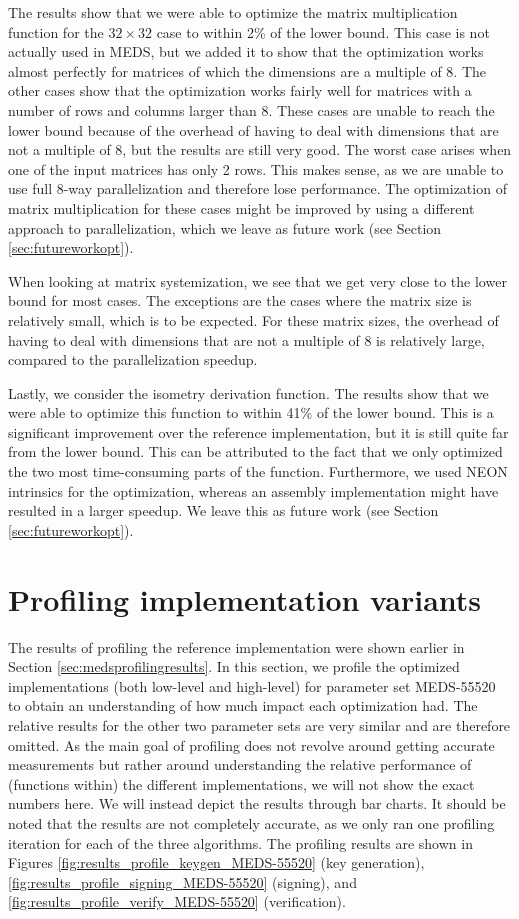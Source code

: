 \documentclass[11pt,a4paper]{report}
\theoremstyle{definition}
\begin{document}
The results show that we were able to optimize the matrix multiplication function for the $32 \times 32$ case to within 2\% of the lower bound. This case is not actually used in MEDS, but we added it to show that the optimization works almost perfectly for matrices of which the dimensions are a multiple of 8. The other cases show that the optimization works fairly well for matrices with a number of rows and columns larger than 8. These cases are unable to reach the lower bound because of the overhead of having to deal with dimensions that are not a multiple of 8, but the results are still very good. The worst case arises when one of the input matrices has only 2 rows. This makes sense, as we are unable to use full 8-way parallelization and therefore lose performance. The optimization of matrix multiplication for these cases might be improved by using a different approach to parallelization, which we leave as future work (see Section \ref{sec:futureworkopt}).

When looking at matrix systemization, we see that we get very close to the lower bound for most cases. The exceptions are the cases where the matrix size is relatively small, which is to be expected. For these matrix sizes, the overhead of having to deal with dimensions that are not a multiple of 8 is relatively large, compared to the parallelization speedup.

Lastly, we consider the isometry derivation function. The results show that we were able to optimize this function to within 41\% of the lower bound. This is a significant improvement over the reference implementation, but it is still quite far from the lower bound. This can be attributed to the fact that we only optimized the two most time-consuming parts of the function. Furthermore, we used NEON intrinsics for the optimization, whereas an assembly implementation might have resulted in a larger speedup. We leave this as future work (see Section \ref{sec:futureworkopt}).

\section{Profiling implementation variants}
\label{sec:profilingoptimizations}
The results of profiling the reference implementation were shown earlier in Section \ref{sec:medsprofilingresults}. In this section, we profile the optimized implementations (both low-level and high-level) for parameter set MEDS-55520 to obtain an understanding of how much impact each optimization had. The relative results for the other two parameter sets are very similar and are therefore omitted. As the main goal of profiling does not revolve around getting accurate measurements but rather around understanding the relative performance of (functions within) the different implementations, we will not show the exact numbers here. We will instead depict the results through bar charts. It should be noted that the results are not completely accurate, as we only ran one profiling iteration for each of the three algorithms. The profiling results are shown in Figures \ref{fig:results_profile_keygen_MEDS-55520} (key generation), \ref{fig:results_profile_signing_MEDS-55520} (signing), and \ref{fig:results_profile_verify_MEDS-55520} (verification).
\end{document}
